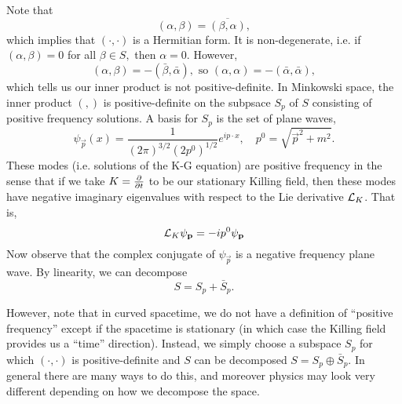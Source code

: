 Note that
\begin{equation}
    (\alpha,\beta)=\overline{(\beta,\alpha)},
\end{equation}
which implies that $(\cdot,\cdot)$ is a Hermitian form. It is non-degenerate, i.e. if $(\alpha,\beta)=0$ for all $\beta \in S,$ then $\alpha=0$. However,
\begin{equation}
    (\alpha,\beta)=-(\bar \beta,\bar \alpha),\text{ so }(\alpha,\alpha)=-(\bar \alpha,\bar \alpha),
\end{equation}
which tells us our inner product is not positive-definite. In Minkowski space, the inner product $({},{})$ is positive-definite on the subpsace $S_p$ of $S$ consisting of positive frequency solutions. A basis for $S_p$ is the set of plane waves,
\begin{equation}
    \psi_{\vec p} (x) = \frac{1}{(2\pi)^{3/2}(2p^0)^{1/2}} e^{ip \cdot x},\quad p^0 =\sqrt{\vec p^2 +m^2}. 
\end{equation}
These modes (i.e. solutions of the K-G equation) are positive frequency in the sense that if we take $K=\P{}{t}$ to be our stationary Killing field, then these modes have negative imaginary eigenvalues with respect to the Lie derivative $\cL_K$. That is,
\begin{equation}
    \cL_K \psi_{\vec p} = -i p^0 \psi_{\vec p}
\end{equation}
Now observe that the complex conjugate of $\psi_{\vec p}$ is a negative frequency plane wave. By linearity, we can decompose
\begin{equation}
    S=S_p + \bar S_p.
\end{equation}

However, note that in curved spacetime, we do not have a definition of ``positive frequency'' except if the spacetime is stationary (in which case the Killing field provides us a ``time'' direction). Instead, we simply choose a subspace $S_p$ for which $(\cdot,\cdot)$ is positive-definite and $S$ can be decomposed $S=S_p\oplus \bar S_p$. In general there are many ways to do this, and moreover physics may look very different depending on how we decompose the space.

